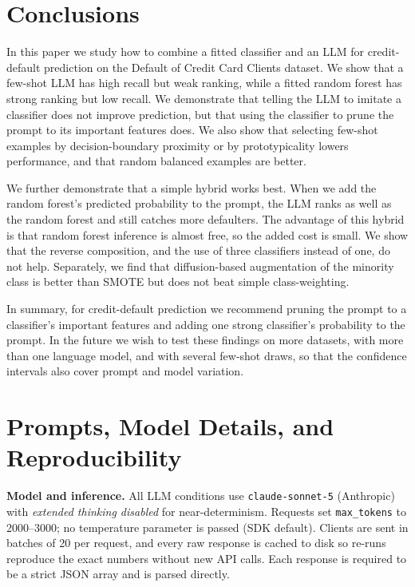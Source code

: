\documentclass[conference]{IEEEtran}
\begin{document}
\section{Conclusions}
In this paper we study how to combine a fitted classifier and an LLM for credit-default prediction on the Default of Credit Card Clients dataset. We show that a few-shot LLM has high recall but weak ranking, while a fitted random forest has strong ranking but low recall. We demonstrate that telling the LLM to imitate a classifier does not improve prediction, but that using the classifier to prune the prompt to its important features does. We also show that selecting few-shot examples by decision-boundary proximity or by prototypicality lowers performance, and that random balanced examples are better.

We further demonstrate that a simple hybrid works best. When we add the random forest's predicted probability to the prompt, the LLM ranks as well as the random forest and still catches more defaulters. The advantage of this hybrid is that random forest inference is almost free, so the added cost is small. We show that the reverse composition, and the use of three classifiers instead of one, do not help. Separately, we find that diffusion-based augmentation of the minority class is better than SMOTE but does not beat simple class-weighting.

In summary, for credit-default prediction we recommend pruning the prompt to a classifier's important features and adding one strong classifier's probability to the prompt. In the future we wish to test these findings on more datasets, with more than one language model, and with several few-shot draws, so that the confidence intervals also cover prompt and model variation.




\appendices
\section{Prompts, Model Details, and Reproducibility}

\textbf{Model and inference.} All LLM conditions use \texttt{claude-sonnet-5} (Anthropic) with \emph{extended thinking disabled} for near-determinism. Requests set \texttt{max\_tokens} to 2000--3000; no temperature parameter is passed (SDK default). Clients are sent in batches of 20 per request, and every raw response is cached to disk so re-runs reproduce the exact numbers without new API calls. Each response is required to be a strict JSON array and is parsed directly.
\end{document}
